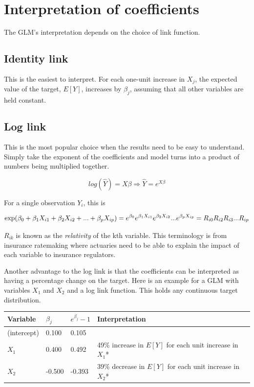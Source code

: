 \documentclass[
  openany]{book}
\begin{document}
\hypertarget{interpretation-of-coefficients}{%
\section{Interpretation of coefficients}\label{interpretation-of-coefficients}}

The GLM's interpretation depends on the choice of link function.

\hypertarget{identity-link}{%
\subsection{Identity link}\label{identity-link}}

This is the easiest to interpret. For each one-unit increase in \(X_j\), the expected value of the target, \(E[Y]\), increases by \(\beta_j\), assuming that all other variables are held constant.

\hypertarget{log-link}{%
\subsection{Log link}\label{log-link}}

This is the most popular choice when the results need to be easy to understand. Simply take the exponent of the coefficients and model turns into a product of numbers being multiplied together.

\[
log(\hat{Y}) = X\beta \Rightarrow \hat{Y} = e^{X \beta}
\]

For a single observation \(Y_i\), this is

\[
\text{exp}(\beta_0 + \beta_1 X_{i1} + \beta_2 X_{i2} + ... + \beta_p X_{ip}) = \\
e^{\beta_0} e^{\beta_1 X_{i1}}e^{\beta_2 X_{i2}} ...  e^{\beta_p X_{ip}} = 
R_{i0} R_{i2} R_{i3} ... R_{ip}
\]

\(R_{ik}\) is known as the \emph{relativity} of the kth variable. This terminology is from insurance ratemaking where actuaries need to be able to explain the impact of each variable to insurance regulators.

Another advantage to the log link is that the coefficients can be interpreted as having a percentage change on the target. Here is an example for a GLM with variables \(X_1\) and \(X_2\) and a log link function. This holds any continuous target distribution.

\begin{longtable}[]{@{}llll@{}}
\toprule
Variable & \(\beta_j\) & \(e^{\beta_j} - 1\) & Interpretation\tabularnewline
\midrule
\endhead
(intercept) & 0.100 & 0.105 &\tabularnewline
\(X_1\) & 0.400 & 0.492 & 49\% increase in \(E[Y]\) for each unit increase in \(X_1\)*\tabularnewline
\(X_2\) & -0.500 & -0.393 & 39\% decrease in \(E[Y]\) for each unit increase in \(X_2\)*\tabularnewline
\bottomrule
\end{longtable}
\end{document}
